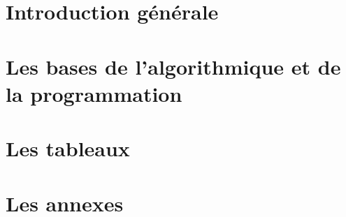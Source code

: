 \documentclass[a4paper,doubleside,11pt]{book}
\begin{document}

	
	
	

	\part{Introduction générale}	
		
		
		

	\part{Les bases de l'algorithmique et de la programmation}
		
		
		
		
		
		

	\part{Les tableaux}
		
		
		
			


	
	\part{Les annexes}
		
	
\end{document}
